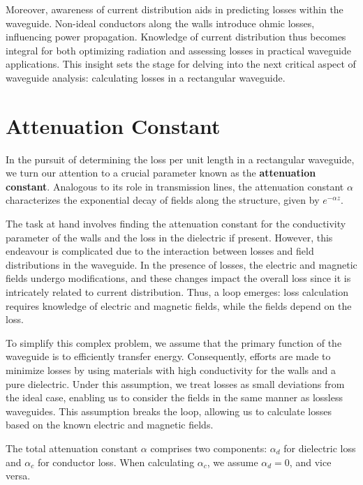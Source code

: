 Moreover, awareness of current distribution aids in predicting losses within the waveguide. Non-ideal conductors along the walls introduce ohmic losses, influencing power propagation. Knowledge of current distribution thus becomes integral for both optimizing radiation and assessing losses in practical waveguide applications. This insight sets the stage for delving into the next critical aspect of waveguide analysis: calculating losses in a rectangular waveguide.

\section{Attenuation Constant}
In the pursuit of determining the loss per unit length in a rectangular waveguide, we turn our attention to a crucial parameter known as the \textbf{attenuation constant}. Analogous to its role in transmission lines, the attenuation constant $\alpha$ characterizes the exponential decay of fields along the structure, given by $e^{-\alpha z}$.

The task at hand involves finding the attenuation constant for the conductivity parameter of the walls and the loss in the dielectric if present. However, this endeavour is complicated due to the interaction between losses and field distributions in the waveguide. In the presence of losses, the electric and magnetic fields undergo modifications, and these changes impact the overall loss since it is intricately related to current distribution. Thus, a loop emerges: loss calculation requires knowledge of electric and magnetic fields, while the fields depend on the loss.

To simplify this complex problem, we assume that the primary function of the waveguide is to efficiently transfer energy. Consequently, efforts are made to minimize losses by using materials with high conductivity for the walls and a pure dielectric. Under this assumption, we treat losses as small deviations from the ideal case, enabling us to consider the fields in the same manner as lossless waveguides. This assumption breaks the loop, allowing us to calculate losses based on the known electric and magnetic fields.

The total attenuation constant $\alpha$ comprises two components: $\alpha_{d}$ for dielectric loss and $\alpha_{c}$ for conductor loss. When calculating $\alpha_{c}$, we assume $\alpha_{d} = 0$, and vice versa.
	
